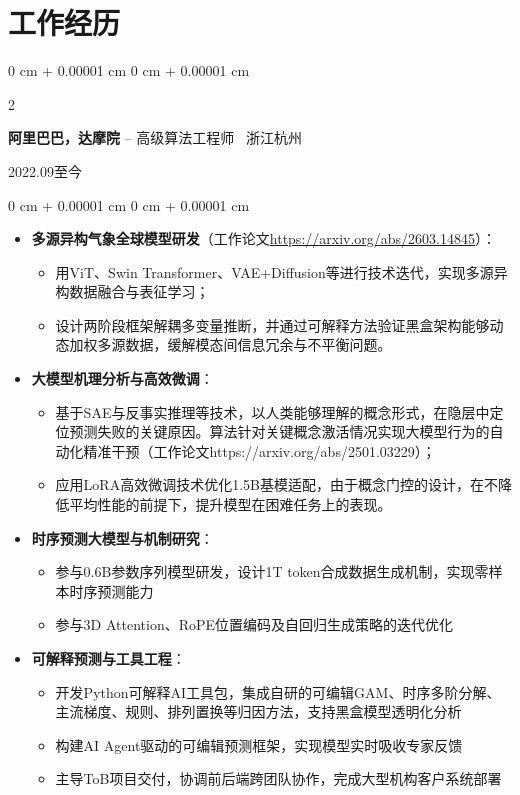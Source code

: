 \documentclass[10pt, letterpaper]{article}
\newenvironment{highlights}{
    \begin{itemize}[
        topsep=0.10 cm,
        parsep=0.10 cm,
        partopsep=0pt,
        itemsep=0pt,
        leftmargin=0 cm + 10pt
    ]
}{
    \end{itemize}
}
\newenvironment{onecolentry}{
    \begin{adjustwidth}{
        0 cm + 0.00001 cm
    }{
        0 cm + 0.00001 cm
    }
}{
    \end{adjustwidth}
}
\newenvironment{twocolentry}[2][]{
    \onecolentry
    \def\secondColumn{#2}
    \setcolumnwidth{\fill, 4.5 cm}
    \begin{paracol}{2}
}{
    \switchcolumn \raggedleft \secondColumn
    \end{paracol}
    \endonecolentry
}
\begin{document}
    \section{工作经历}
    \begin{twocolentry}{2022.09至今}
        \textbf{阿里巴巴，达摩院} -- 高级算法工程师 \hspace{0.5cm}\faMapMarker\ 浙江杭州
    \end{twocolentry}
    \begin{onecolentry}
        \begin{highlights}
            \item \textbf{多源异构气象全球模型研发}（工作论文\href{https://arxiv.org/abs/2603.14845}{https://arxiv.org/abs/2603.14845}）：
                \begin{itemize}
                    \item 用ViT、Swin Transformer、VAE+Diffusion等进行技术迭代，实现多源异构数据融合与表征学习；
                    \item 设计两阶段框架解耦多变量推断，并通过可解释方法验证黑盒架构能够动态加权多源数据，缓解模态间信息冗余与不平衡问题。
                \end{itemize}
            \item \textbf{大模型机理分析与高效微调}：
                \begin{itemize}
                    \item 基于SAE与反事实推理等技术，以人类能够理解的概念形式，在隐层中定位预测失败的关键原因。算法针对关键概念激活情况实现大模型行为的自动化精准干预（工作论文https://arxiv.org/abs/2501.03229）；
                    \item 应用LoRA高效微调技术优化1.5B基模适配，由于概念门控的设计，在不降低平均性能的前提下，提升模型在困难任务上的表现。
                \end{itemize}
            \item \textbf{时序预测大模型与机制研究}：
                \begin{itemize}
                    \item 参与0.6B参数序列模型研发，设计1T token合成数据生成机制，实现零样本时序预测能力
                    \item 参与3D Attention、RoPE位置编码及自回归生成策略的迭代优化
                \end{itemize}
            \item \textbf{可解释预测与工具工程}：
                \begin{itemize}
                    \item 开发Python可解释AI工具包，集成自研的可编辑GAM、时序多阶分解、主流梯度、规则、排列置换等归因方法，支持黑盒模型透明化分析
                    \item 构建AI Agent驱动的可编辑预测框架，实现模型实时吸收专家反馈
                    \item 主导ToB项目交付，协调前后端跨团队协作，完成大型机构客户系统部署
                \end{itemize}
        \end{highlights}
    \end{onecolentry}
\end{document}
